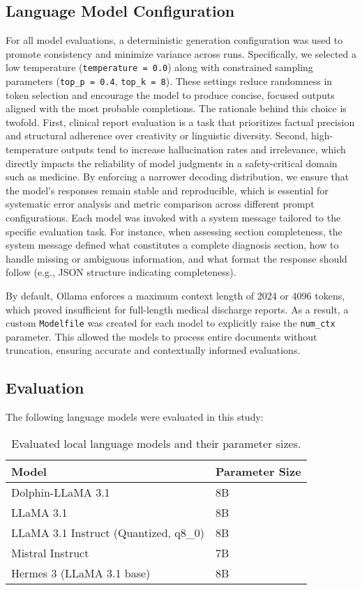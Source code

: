 \subsection{Language Model Configuration}
For all model evaluations, a deterministic generation configuration was used 
to promote consistency and minimize variance across runs. 
Specifically, we selected a low temperature (\texttt{temperature = 0.0}) 
along with constrained sampling parameters (\texttt{top\_p = 0.4},
\texttt{top\_k = 8}). 
These settings reduce randomness in token selection and encourage the 
model to produce concise, focused outputs aligned with the most probable completions.
The rationale behind this choice is twofold. 
First, clinical report evaluation is a task that prioritizes factual precision 
and structural adherence over creativity or linguistic diversity. 
Second, high-temperature outputs tend to increase hallucination rates and irrelevance, 
which directly impacts the reliability of model judgments in a safety-critical 
domain such as medicine.
By enforcing a narrower decoding distribution, we ensure that the model’s responses 
remain stable and reproducible, which is essential for systematic error 
analysis and metric comparison across different prompt configurations.
Each model was invoked with a system message tailored to the specific evaluation task. 
For instance, when assessing section completeness, 
the system message defined what constitutes a complete diagnosis section, 
how to handle missing or ambiguous information, and what format the response 
should follow (e.g., JSON structure indicating completeness).

By default, Ollama enforces a maximum context length of 2024 or 4096 tokens, 
which proved insufficient for full-length medical discharge reports. 
As a result, a custom \texttt{Modelfile} was created for each model to 
explicitly raise the \texttt{num\_ctx} parameter. 
This allowed the models to process entire documents without truncation, 
ensuring accurate and contextually informed evaluations.

\subsection{Evaluation}
The following language models were evaluated in this study:

\begin{table}[H]
\centering
\begin{tabular}{l l}
\toprule
\textbf{Model} & \textbf{Parameter Size} \\
\midrule
Dolphin-LLaMA 3.1 & 8B \\
LLaMA 3.1 & 8B \\
LLaMA 3.1 Instruct (Quantized, q8\_0) & 8B \\
Mistral Instruct & 7B \\
Hermes 3 (LLaMA 3.1 base) & 8B \\
\bottomrule
\end{tabular}
\caption{Evaluated local language models and their parameter sizes.}
\label{tab:llm_models}
\end{table}

